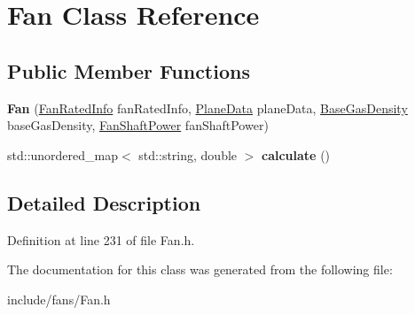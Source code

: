 \hypertarget{class_fan}{}\section{Fan Class Reference}
\label{class_fan}
\subsection*{Public Member Functions}
\begin{DoxyCompactItemize}
\item 
\mbox{\label{class_fan_a95fdcf17dfae2f251516b74280b2b18d}} 
{\bfseries Fan} (\hyperlink{class_fan_rated_info}{Fan\+Rated\+Info} fan\+Rated\+Info, \hyperlink{class_plane_data}{Plane\+Data} plane\+Data, \hyperlink{class_base_gas_density}{Base\+Gas\+Density} base\+Gas\+Density, \hyperlink{class_fan_shaft_power}{Fan\+Shaft\+Power} fan\+Shaft\+Power)
\item 
\mbox{\label{class_fan_a33fd92b2929ff02452265537e5aefb4d}} 
std\+::unordered\+\_\+map$<$ std\+::string, double $>$ {\bfseries calculate} ()
\end{DoxyCompactItemize}


\subsection{Detailed Description}


Definition at line 231 of file Fan.\+h.



The documentation for this class was generated from the following file\+:\begin{DoxyCompactItemize}
\item 
include/fans/Fan.\+h\end{DoxyCompactItemize}
